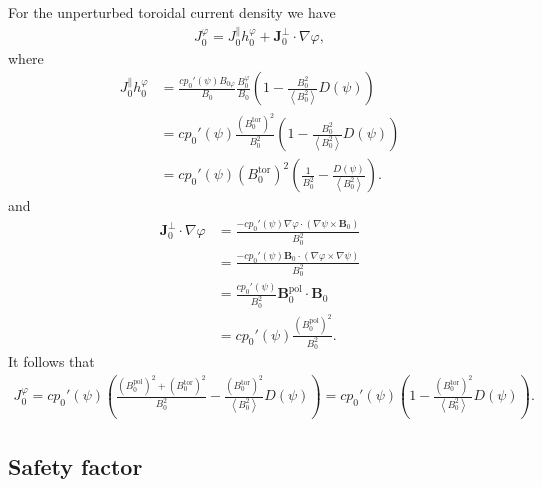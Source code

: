 \documentclass[a4paper, twoside, 10pt, english]{article}
\numberwithin{equation}{section}
\let\temp\varrho
\let\varrho\rho
\let\rho\temp
\let\temp\vartheta
\let\vartheta\theta
\let\theta\temp
\let\temp\varphi
\let\varphi\phi
\let\phi\temp
\let\vec\symbf
\newcommand*\grad{\ensuremath{\nabla}}
\newcommand*\pol{\ensuremath{\textrm{pol}}}  %
\newcommand*\tor{\ensuremath{\textrm{tor}}}  %
\begin{document}
For the unperturbed toroidal current density we have
\begin{gather}
  J_{0}^{\phi} = J_{0}^{\parallel} h_{0}^{\phi} + \vec{J}_{0}^{\perp} \cdot \grad \phi,
\end{gather}
where
\begin{align}
  J_{0}^{\parallel} h_{0}^{\phi} &= \frac{c p_{0}'(\psi) B_{0 \phi}}{B_{0}} \frac{B_{0}^{\phi}}{B_{0}} \left( 1 - \frac{B_{0}^{2}}{\left\langle B_{0}^{2} \right\rangle} D(\psi) \right) \nonumber \\
  &= c p_{0}'(\psi) \frac{\left( B_{0}^{\tor} \right)^{2}}{B_0^2} \left( 1 - \frac{B_{0}^{2}}{\left\langle B_{0}^{2} \right\rangle} D(\psi) \right) \nonumber \\
  &= c p_{0}'(\psi) \left( B_{0}^{\tor} \right)^{2} \left( \frac{1}{B_{0}^{2}} - \frac{D(\psi)}{\left\langle B_{0}^{2} \right\rangle} \right).
\end{align}
and
\begin{align}
  \vec{J}_{0}^{\perp} \cdot \grad \phi &= \frac{-c p_{0}'(\psi) \grad \phi \cdot (\grad \psi \times \vec{B}_{0})}{B_{0}^{2}} \nonumber \\
  &= \frac{-c p_{0}'(\psi) \vec{B}_{0} \cdot (\grad \phi \times \grad \psi)}{B_{0}^{2}} \\
  &= \frac{c p_{0}'(\psi)}{B_{0}^{2}} \vec{B}_{0}^{\pol} \cdot \vec{B}_{0} \nonumber \\
  &= c p_{0}'(\psi) \frac{\left( B_{0}^{\pol} \right)^{2}}{B_{0}^{2}}.
\end{align}
It follows that
\begin{gather}
  J_{0}^{\phi} = c p_{0}'(\psi) \left( \frac{\left( B_{0}^{\pol} \right)^{2} + \left( B_{0}^{\tor} \right)^{2}}{B_{0}^{2}} - \frac{\left( B_{0}^{\tor} \right)^{2}}{\left\langle B_{0}^{2} \right\rangle} D(\psi)\right) = c p_{0}'(\psi) \left( 1 - \frac{\left( B_{0}^{\tor} \right)^{2}}{\left\langle B_{0}^{2} \right\rangle} D(\psi)\right).
\end{gather}

\subsection{Safety factor}
\label{sec:safety_factor}
\end{document}
